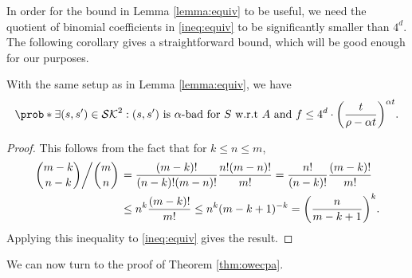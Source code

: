 In order for the bound in Lemma \ref{lemma:equiv} to be useful,
we need the quotient of binomial coefficients in \eqref{ineq:equiv}
to be significantly smaller than \(4^{d}\).
The following corollary gives a straightforward bound,
which will be good enough for our purposes.

\begin{corollary}\label{corollary:equiv}
  With the same setup as in Lemma \ref{lemma:equiv}, we have
  \begin{equation}\label{ineq:corollary:equiv}
    \prob*{\exists (s,s') \in \setSK^{2} : (s,s') \text{ is \(\alpha\)-bad for } S \text{ w.r.t \(A\) and \(f\)}}
    \le 4^{d} \cdot \left( \frac{t}{\rho - \alpha t} \right)^{\alpha t}.
  \end{equation}
\end{corollary}

\begin{proof}
  This follows from the fact that for \(k \le n \le m\),
  \begin{align}
    \left. \binom{m - k}{n - k} \middle/ \binom{m}{n} \right.
    & = \frac{(m-k)!}{(n-k)!(m-n)!} \frac{n!(m-n)!}{m!}
    = \frac{n!}{(n-k)!} \frac{(m-k)!}{m!} \notag\\
    & \le n^{k} \frac{(m-k)!}{m!} \notag
    \le n^{k} (m-k+1)^{-k}
    = \left( \frac{n}{m - k + 1} \right)^{k}. \notag
  \end{align}
  Applying this inequality to \eqref{ineq:equiv} gives the result.
\end{proof}

We can now turn to the proof of Theorem \ref{thm:owecpa}.

